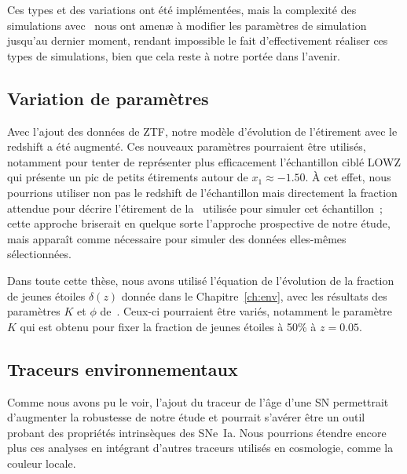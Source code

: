\documentclass[../main/main.tex]{subfiles}
\begin{document}
Ces types et des variations ont été implémentées, mais la complexité des
simulations avec \snana\ nous ont amenæ à modifier les paramètres de simulation
jusqu'au dernier moment, rendant impossible le fait d'effectivement réaliser ces
types de simulations, bien que cela reste à notre portée dans l'avenir.

\subsection{Variation de paramètres}\label{ssec:pvar}

Avec l'ajout des données de ZTF, notre modèle d'évolution de l'étirement avec le
redshift a été augmenté. Ces nouveaux paramètres pourraient être utilisés,
notamment pour tenter de représenter plus efficacement l'échantillon ciblé LOWZ
qui présente un pic de petits étirements autour de $x_1 \approx -1.50$. À cet
effet, nous pourrions utiliser non pas le redshift de l'échantillon mais
directement la fraction attendue pour décrire l'étirement de la \hostlib\
utilisée pour simuler cet échantillon~; cette approche briserait en quelque
sorte l'approche prospective de notre étude, mais apparaît comme nécessaire pour
simuler des données elles-mêmes sélectionnées.

Dans toute cette thèse, nous avons utilisé l'équation de l'évolution de la
fraction de jeunes étoiles $\delta(z)$ donnée dans le Chapitre~\ref{ch:env},
avec les résultats des paramètres $K$ et $\phi$ de~\cite{rigault2020}. Ceux-ci
pourraient être variés, notamment le paramètre $K$ qui est obtenu pour fixer la
fraction de jeunes étoiles à 50\% à $z = \num{0.05}$.

\subsection{Traceurs environnementaux}\label{ssec:envtrac}

Comme nous avons pu le voir, l'ajout du traceur de l'âge d'une SN permettrait
d'augmenter la robustesse de notre étude et pourrait s'avérer être un outil
probant des propriétés intrinsèques des SNe~Ia. Nous pourrions étendre encore
plus ces analyses en intégrant d'autres traceurs utilisés en cosmologie, comme
la couleur locale.
\end{document}
